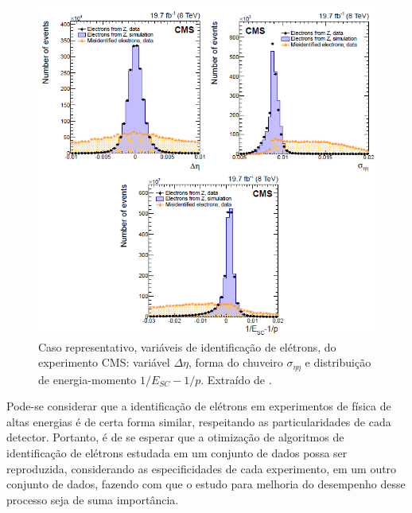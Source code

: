 \begin{figure}[H]
	\begin{center}
		\includegraphics[width=0.8\linewidth]{./figuras/variaveisCMS.png}
		\caption{Caso representativo, variáveis de identificação de elétrons, do experimento CMS: variável $\Delta\eta$, forma do chuveiro $\sigma_{\eta\eta}$ e distribuição de energia-momento $1/E_{SC}-1/p$. Extraído de \cite{cms2015performance}.}\label{fig:15} 
	\end{center}
\end{figure}

Pode-se considerar que a identificação de elétrons em experimentos de física de altas energias é de certa forma similar, respeitando as particularidades de cada detector. Portanto, é de se esperar que a otimização de algoritmos de identificação de elétrons estudada em um conjunto de dados possa ser reproduzida, considerando as especificidades de cada experimento, em um outro conjunto de dados, fazendo com que o estudo para melhoria do desempenho desse processo seja de suma importância.

